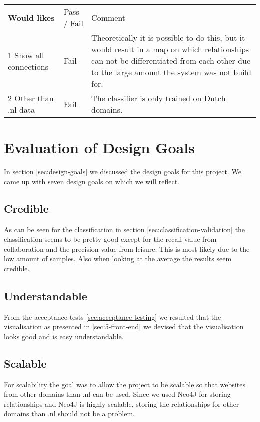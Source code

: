 \begin{table}[H]
\begin{tabular}{ll m{8cm}}
\textbf{Would likes}                    & Pass / Fail & Comment                                                                                                                                                                                                                               \\
1 Show all connections         & Fail        & Theoretically it is possible to do this, but it would result in a map on which relationships can not be differentiated from each other due to the large amount the system was not build for. \\
2 Other than .nl data          & Fail        & The classifier is only trained on Dutch domains.                                                                 
\end{tabular}
\end{table}

\section{Evaluation of Design Goals}
In section \ref{sec:design-goals} we discussed the design goals for this project. We came up with seven design goals on which we will reflect.

\subsection{Credible}
As can be seen for the classification in section \ref{sec:classification-validation} the classification seems to be pretty good except for the recall value from collaboration and the precision value from leisure. This is most likely due to the low amount of samples. Also when looking at the average the results seem credible.

\subsection{Understandable}
From the acceptance tests \ref{sec:acceptance-testing} we resulted that the visualisation as presented in \ref{sec:5-front-end} we devised that the visualisation looks good and is easy understandable.

\subsection{Scalable}
For scalability the goal was to allow the project to be scalable so that websites from other domains than .nl can be used. Since we used Neo4J for storing relationships and Neo4J is highly scalable, storing the relationships for other domains than .nl should not be a problem. 


